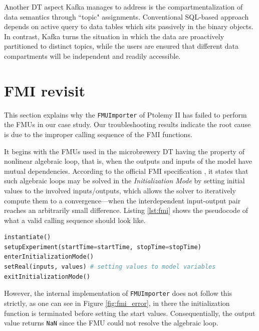 Another DT aspect Kafka manages to address is the compartmentalization of data semantics through ``topic" assignments. Conventional SQL-based approach depends on active query to data tables which sits passively in the binary objects. In contrast, Kafka turns the situation in which the data are proactively partitioned to distinct topics, while the users are ensured that different data compartments will be independent and readily accessible.  


\chapter{FMI revisit} \label{apd:fmi}
This section explains why the \texttt{FMUImporter} of Ptolemy II has failed to perform the FMUs in our case study. Our troubleshooting results indicate the root cause is due to the improper calling sequence of the FMI functions.

It begins with the FMUs used in the microbrewery DT having the property of nonlinear algebraic loop, that is, when the outputs and inputs of the model have mutual dependencies. According to the official FMI specification \cite{fmidoc}, it states that such algebraic loops may be solved in the \textit{Initialization Mode} by setting initial values to the involved inputs/outputs, which allows the solver to iteratively compute them to a convergence---when the interdependent input-output pair reaches an arbitrarily small difference. Listing \ref{lst:fmi} shows the pseudocode of what a valid calling sequence should look like.

\begin{lstlisting}[language=Python, label={lst:fmi}, caption={Resolving algebraic loop in the Initialization Mode}]
instantiate()
setupExperiment(startTime=startTime, stopTime=stopTime) 
enterInitializationMode()
setReal(inputs, values) # setting values to model variables
exitInitializationMode()
\end{lstlisting} 

However, the internal implementation of \texttt{FMUImporter} does not follow this strictly, as one can see in Figure \ref{fig:fmi_error}, in there the initialization function is terminated before setting the start values. Consequentially, the output value returns \texttt{NaN} since the FMU could not resolve the algebraic loop.

